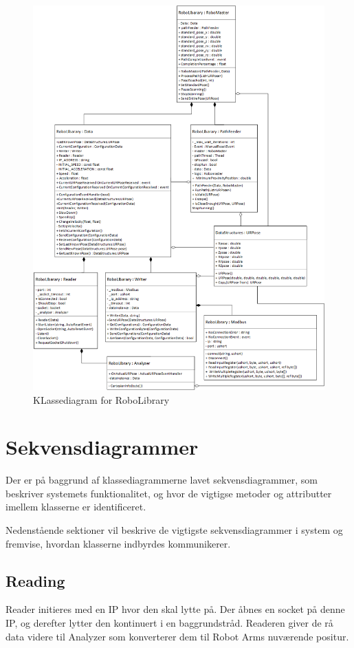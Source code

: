 \begin{figure}[H]
    \centering
    \includegraphics[width=1\textwidth]{figurer/d/Design/Class/uml_class_robolibrary}
    \caption{KLassediagram for RoboLibrary}
    \label{class_RoboLib}
\end{figure}

\newpage
\section{Sekvensdiagrammer}
Der er på baggrund af klassediagrammerne lavet sekvensdiagrammer, som beskriver systemets funktionalitet, og hvor de vigtigse metoder og attributter imellem klasserne er identificeret.

Nedenstående sektioner vil beskrive de vigtigste sekvensdiagrammer i system og fremvise, hvordan klasserne indbyrdes kommunikerer. 

\subsection{Reading} 
Reader initieres med en IP hvor den skal lytte på. 
Der åbnes en socket på denne IP, og derefter lytter den kontinuert i en baggrundstråd. 
Readeren giver de rå data videre til Analyzer som konverterer dem til Robot Arms nuværende positur.

